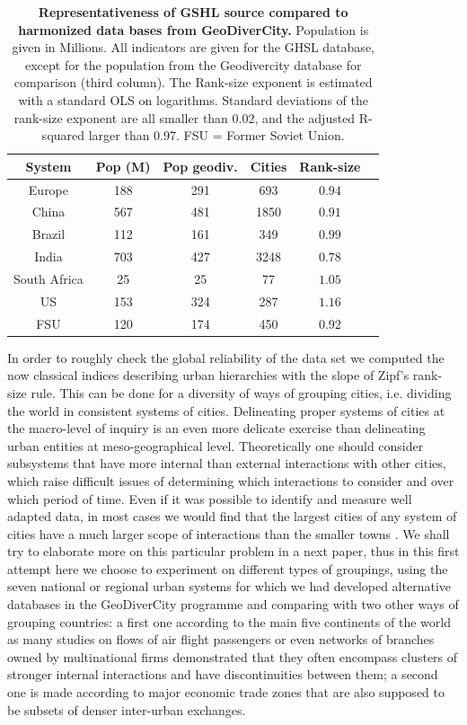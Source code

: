 \documentclass[11pt]{article}
\begin{document}
\begin{table}
\caption{\textbf{Representativeness of GSHL source compared to harmonized data bases from GeoDiverCity.} Population is given in Millions. All indicators are given for the GHSL database, except for the population from the Geodivercity database for comparison (third column). The Rank-size exponent is estimated with a standard OLS on logarithms. Standard deviations of the rank-size exponent are all smaller than 0.02, and the adjusted R-squared larger than 0.97. FSU = Former Soviet Union.\label{tab:populations}}
\centering
\begin{tabular}{cccccc}
    \toprule
        System & Pop (M) & Pop geodiv. & Cities & Rank-size  \\
        \midrule
         Europe & 188 & 291 & 693 & $0.94$  \\
         China & 567 & 481 & 1850 & $0.91$  \\
         Brazil & 112 & 161 & 349 & $0.99$  \\
         India & 703 & 427 & 3248 & $0.78$  \\
         South Africa & 25 & 25 & 77 & $1.05$ \\
         US & 153 & 324 & 287 & $1.16$  \\
         FSU & 120 & 174 & 450 & $0.92$ \\
         \bottomrule
\end{tabular}
\end{table}

In order to roughly check the global reliability of the data set we computed the now classical indices describing urban hierarchies with the slope of Zipf's rank-size rule. This can be done for a diversity of ways of grouping cities, i.e. dividing the world in consistent systems of cities. Delineating proper systems of cities at the macro-level of inquiry is an even more delicate exercise than delineating urban entities at meso-geographical level. Theoretically one should consider subsystems that have more internal than external interactions with other cities, which raise difficult issues of determining which interactions to consider and over which period of time. Even if it was possible to identify and measure well adapted data, in most cases we would find that the largest cities of any system of cities have a much larger scope of interactions than the smaller towns \cite{bretagnolle2010simulating}. We shall try to elaborate more on this particular problem in a next paper, thus in this first attempt here we choose to experiment on different types of groupings, using the seven national or regional urban systems for which we had developed alternative databases in the GeoDiverCity programme \cite{pumain2015multilevel} and comparing with two other ways of grouping countries: a first one according to the main five continents of the world as many studies on flows of air flight passengers or even networks of branches owned by multinational firms demonstrated that they often encompass clusters of stronger internal interactions and have discontinuities between them; a second one is made according to major economic trade zones that are also supposed to be subsets of denser inter-urban exchanges. 
\end{document}
